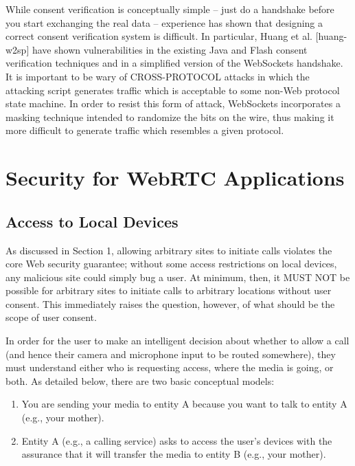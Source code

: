\documentclass{article}
\begin{document}
While consent verification is conceptually simple -- just do a
handshake before you start exchanging the real data -- experience has
shown that designing a correct consent verification system is
difficult.  In particular, Huang et al. [huang-w2sp] have shown
vulnerabilities in the existing Java and Flash consent verification
techniques and in a simplified version of the WebSockets handshake.
It is important to be wary of CROSS-PROTOCOL attacks in which the
attacking script generates traffic which is acceptable to some non-Web
protocol state machine.  In order to resist this form of attack,
WebSockets incorporates a masking technique intended to randomize the
bits on the wire, thus making it more difficult to generate traffic
which resembles a given protocol.

\section{Security for WebRTC Applications}

\subsection{Access to Local Devices}

As discussed in Section 1, allowing arbitrary sites to initiate calls
violates the core Web security guarantee; without some access
restrictions on local devices, any malicious site could simply bug a
user.  At minimum, then, it MUST NOT be possible for arbitrary sites
to initiate calls to arbitrary locations without user consent.  This
immediately raises the question, however, of what should be the scope
of user consent.

In order for the user to make an intelligent decision about whether
to allow a call (and hence their camera and microphone input to be
routed somewhere), they must understand either who is requesting
access, where the media is going, or both.  As detailed below, there
are two basic conceptual models:

\begin{enumerate}
\item You are sending your media to entity A because you want to talk
      to entity A (e.g., your mother).

\item Entity A (e.g., a calling service) asks to access the user's
      devices with the assurance that it will transfer the media to
      entity B (e.g., your mother).
\end{enumerate}
\end{document}

